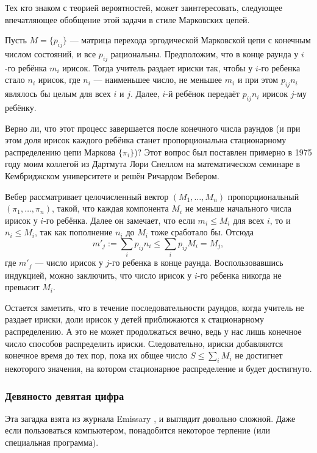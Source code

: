 Тех кто знаком с теорией вероятностей, может заинтересовать, следующее впечатляющее обобщение этой задачи в стиле Марковских цепей.

Пусть $M=\{p_{ij}\}$ --- матрица перехода эргодической Марковской цепи с конечным числом состояний, и все $p_{ij}$ рациональны.
Предположим, что в конце раунда у $i$-го ребёнка $m_i$ ирисок.
Тогда учитель раздает ириски так, чтобы у $i$-го ребенка стало $n_i$ ирисок, где $n_i$ --- наименьшее число, не меньшее  $m_i$ и при этом $p_{ij}n_i$ являлось бы целым для всех $i$ и $j$.
Далее, $i$-й ребёнок передаёт $p_{ij}n_i$ ирисок $j$-му ребёнку.

Верно ли, что этот процесс завершается после конечного числа раундов
(и при этом доля ирисок каждого ребёнка станет пропорциональна стационарному распределению цепи Маркова $\{\pi_i\}$)?
Этот вопрос был поставлен примерно в 1975 году моим коллегой из Дартмута Лори Снеллом на математическом семинаре в Кембриджском университете и решён Ричардом Вебером.

Вебер рассматривает целочисленный вектор $(M_1, \dots , M_n)$ пропорциональный $(\pi_1, \dots , \pi_n)$, такой, что каждая компонента $M_i$ не меньше начального числа ирисок у $i$-го ребёнка.
Далее он замечает, что если $m_i \leqslant M_i$ для всех $i$, то и $n_i \leqslant M_i$, так как пополнение $n_i$ до $M_i$ тоже сработало бы.
Отсюда 
\[m'_j
:=
\sum_i p_{ij} n_i
\leqslant
\sum_i p_{ij} M_i
=
M_j,\] где $m'_j$ --- число ирисок у $j$-го ребенка в конце раунда.
Воспользовавшись индукцией, можно заключить, что число ирисок у $i$-го ребенка никогда не превысит $M_i$.

Остается заметить, что в течение последовательности раундов, когда учитель не раздает ириски, доли ирисок у детей приближаются к стационарному распределению.
А это не может продолжаться вечно, ведь у нас лишь конечное число способов распределить ириски.
Следовательно, ириски добавляются конечное время до тех пор, пока их общее число $S\leqslant\sum_iM_i$ не достигнет некоторого значения, на котором стационарное распределение и будет достигнуто.

\subsubsection*{Девяносто девятая цифра}

Эта загадка взята из журнала Emissary \cite[осень 1999]{3}, и выглядит довольно сложной.
Даже если пользоваться компьютером, понадобится некоторое терпение (или специальная программа).

